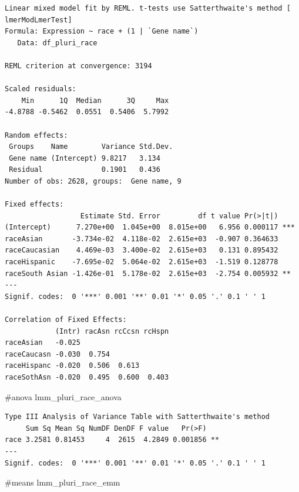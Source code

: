 \documentclass[
  letterpaper,
  DIV=11,
  numbers=noendperiod]{scrartcl}
\newenvironment{Shaded}{\begin{snugshade}}{\end{snugshade}}
\newcommand{\CommentTok}[1]{\textcolor[rgb]{0.37,0.37,0.37}{#1}}
\newcommand{\NormalTok}[1]{\textcolor[rgb]{0.00,0.23,0.31}{#1}}
\begin{document}
\begin{verbatim}
Linear mixed model fit by REML. t-tests use Satterthwaite's method [
lmerModLmerTest]
Formula: Expression ~ race + (1 | `Gene name`)
   Data: df_pluri_race

REML criterion at convergence: 3194

Scaled residuals: 
    Min      1Q  Median      3Q     Max 
-4.8788 -0.5462  0.0551  0.5406  5.7992 

Random effects:
 Groups    Name        Variance Std.Dev.
 Gene name (Intercept) 9.8217   3.134   
 Residual              0.1901   0.436   
Number of obs: 2628, groups:  Gene name, 9

Fixed effects:
                  Estimate Std. Error         df t value Pr(>|t|)    
(Intercept)      7.270e+00  1.045e+00  8.015e+00   6.956 0.000117 ***
raceAsian       -3.734e-02  4.118e-02  2.615e+03  -0.907 0.364633    
raceCaucasian    4.469e-03  3.400e-02  2.615e+03   0.131 0.895432    
raceHispanic    -7.695e-02  5.064e-02  2.615e+03  -1.519 0.128778    
raceSouth Asian -1.426e-01  5.178e-02  2.615e+03  -2.754 0.005932 ** 
---
Signif. codes:  0 '***' 0.001 '**' 0.01 '*' 0.05 '.' 0.1 ' ' 1

Correlation of Fixed Effects:
            (Intr) racAsn rcCcsn rcHspn
raceAsian   -0.025                     
raceCaucasn -0.030  0.754              
raceHispanc -0.020  0.506  0.613       
raceSothAsn -0.020  0.495  0.600  0.403
\end{verbatim}

\begin{Shaded}
\begin{Highlighting}[]
\CommentTok{\#anova}
\NormalTok{lmm\_pluri\_race\_anova}
\end{Highlighting}
\end{Shaded}

\begin{verbatim}
Type III Analysis of Variance Table with Satterthwaite's method
     Sum Sq Mean Sq NumDF DenDF F value   Pr(>F)   
race 3.2581 0.81453     4  2615  4.2849 0.001856 **
---
Signif. codes:  0 '***' 0.001 '**' 0.01 '*' 0.05 '.' 0.1 ' ' 1
\end{verbatim}

\begin{Shaded}
\begin{Highlighting}[]
\CommentTok{\#means }
\NormalTok{lmm\_pluri\_race\_emm}
\end{Highlighting}
\end{Shaded}
\end{document}
